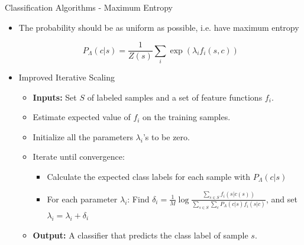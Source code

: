 \documentclass{beamer}
\begin{document}

\begin{frame}{Classification Algorithms - Maximum Entropy}

\begin{itemize}
 \item The probability should be as uniform as possible, i.e. have maximum entropy

\begin{equation}
\label{mx:expdistr}
P_{\Lambda}(c|s) = \frac{1}{Z(s)} \sum_{i}\exp(\lambda_i f_i(s,c))
\end{equation}

 \item Improved Iterative Scaling

\begin{itemize}
	\item \textbf{Inputs:} Set $S$ of labeled samples and a set of feature functions $f_i$.
	\item Estimate expected value of $f_i$ on the training samples.
	\item Initialize all the parameters $\lambda_i$'s to be zero.
	\item Iterate until convergence:
	\begin{itemize}
		\item Calculate the expected class labels for each sample with $P_{\Lambda}(c|s)$
		\item For each parameter $\lambda_i$: Find $\delta_i  = \frac{1}{M} \log \frac{\sum_{s \in S} f_i (s|c(s))}{\sum_{s \in S}\sum_{c} P_{\Lambda}(c|s) f_i(s|c) }$, and set $\lambda_i = \lambda_i + \delta_i$
	\end{itemize}		
	\item \textbf{Output:} A classifier that predicts the class label of sample  $s$.
\end{itemize}

\end{itemize}

\end{frame}

\end{document}
